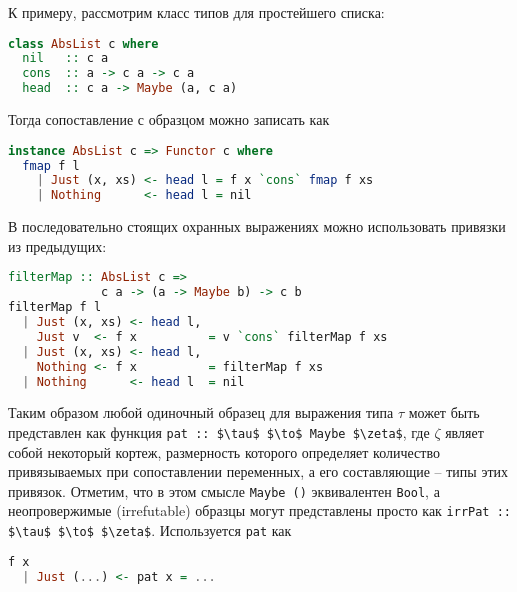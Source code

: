 К примеру, рассмотрим класс типов для простейшего списка:

\noindent
\begin{minipage}{\linewidth}
\begin{lstlisting}[language=haskell]
class AbsList c where
  nil   :: c a
  cons  :: a -> c a -> c a
  head  :: c a -> Maybe (a, c a)
\end{lstlisting}
\end{minipage}

Тогда сопоставление с образцом можно записать как

\noindent
\begin{minipage}{\linewidth}
\begin{lstlisting}[language=haskell]
instance AbsList c => Functor c where
  fmap f l 
    | Just (x, xs) <- head l = f x `cons` fmap f xs
    | Nothing      <- head l = nil
\end{lstlisting}
\end{minipage}

В последовательно стоящих охранных выражениях можно использовать привязки из предыдущих:

\noindent
\begin{minipage}{\linewidth}
\begin{lstlisting}[language=haskell]
filterMap :: AbsList c => 
             c a -> (a -> Maybe b) -> c b
filterMap f l
  | Just (x, xs) <- head l, 
    Just v  <- f x          = v `cons` filterMap f xs
  | Just (x, xs) <- head l,
    Nothing <- f x          = filterMap f xs
  | Nothing      <- head l  = nil
\end{lstlisting}
\end{minipage}

Таким образом любой одиночный образец для выражения типа $ \tau $ может быть представлен как функция \lstinline[breaklines]|pat :: $\tau$ $\to$ Maybe $\zeta$|, где $ \zeta $ являет собой некоторый кортеж, размерность которого определяет количество привязываемых при сопоставлении переменных, а его составляющие -- типы этих привязок. Отметим, что в этом смысле \lstinline[breaklines]|Maybe ()| эквивалентен \lstinline[breaklines]|Bool|, а неопровержимые (irrefutable) образцы могут представлены просто как \lstinline[breaklines]|irrPat :: $\tau$ $\to$ $\zeta$|. Используется \lstinline|pat| как

\noindent
\begin{minipage}{\linewidth}
\begin{lstlisting}[language=haskell]
f x
  | Just (...) <- pat x = ...
\end{lstlisting}
\end{minipage}

